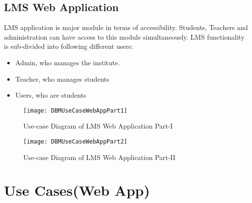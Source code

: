 \newpage
\subsection{LMS Web Application}
LMS application is major module in terms of accessibility. Students, Teachers and administration can have access to this module simultaneously. LMS functionality is sub-divided into following different users:

\begin{itemize}

\item Admin, who manages the institute.
\item Teacher, who manages students
\item Users, who are students

\end{itemize}

\newpage
\begin{figure}[h]
  \centering
  \texttt{[image: DBMUseCaseWebAppPart1]}
  \caption{Use-case Diagram of LMS Web Application Part-I}
\end{figure}

\newpage

\begin{figure}[h]
  \centering
  \texttt{[image: DBMUseCaseWebAppPart2]}
  \caption{Use-case Diagram of LMS Web Application Part-II}
\end{figure}


\section{Use Cases(Web App)}

